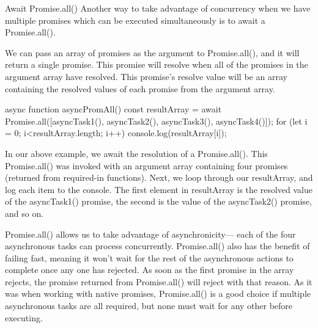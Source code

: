 Await Promise.all()
    Another way to take advantage of concurrency when we have multiple promises which can be executed simultaneously is to await a Promise.all().

    We can pass an array of promises as the argument to Promise.all(), and it will return a single promise. This promise will resolve when all of the promises in the argument array have resolved. This promise’s resolve value will be an array containing the resolved values of each promise from the argument array.

        async function asyncPromAll() {
        const resultArray = await Promise.all([asyncTask1(), asyncTask2(), asyncTask3(), asyncTask4()]);
        for (let i = 0; i<resultArray.length; i++){
            console.log(resultArray[i]); 
        }
        }

    In our above example, we await the resolution of a Promise.all(). This Promise.all() was invoked with an argument array containing four promises (returned from required-in functions). Next, we loop through our resultArray, and log each item to the console. The first element in resultArray is the resolved value of the asyncTask1() promise, the second is the value of the asyncTask2() promise, and so on.

    Promise.all() allows us to take advantage of asynchronicity— each of the four asynchronous tasks can process concurrently. Promise.all() also has the benefit of failing fast, meaning it won’t wait for the rest of the asynchronous actions to complete once any one has rejected. As soon as the first promise in the array rejects, the promise returned from Promise.all() will reject with that reason. As it was when working with native promises, Promise.all() is a good choice if multiple asynchronous tasks are all required, but none must wait for any other before executing.